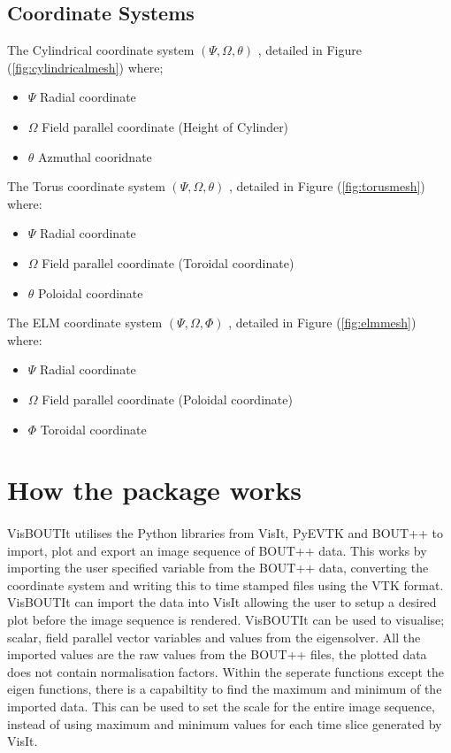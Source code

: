 \documentclass[12pt,a4paper]{article}
\begin{document}
\subsection{Coordinate Systems}
The Cylindrical coordinate system $(\Psi , \Omega , \theta )$ , detailed in Figure (\ref{fig:cylindricalmesh}) where;
\begin{itemize}
	\item{$\Psi$ Radial coordinate}
	\item{$\Omega$ Field parallel coordinate (Height of Cylinder)}
	\item{$\theta$ Azmuthal cooridnate}
\end{itemize}
The Torus coordinate system $(\Psi, \Omega, \theta)$ , detailed in Figure (\ref{fig:torusmesh}) where:
\begin{itemize}
	\item{$\Psi$ Radial coordinate}
	\item{$\Omega$ Field parallel coordinate (Toroidal coordinate)}
	\item{$\theta$ Poloidal coordinate}
\end{itemize}
The ELM coordinate system $(\Psi,\Omega, \Phi)$ , detailed in Figure (\ref{fig:elmmesh}) where:
\begin{itemize}
	\item{$\Psi$ Radial coordinate}
	\item{$\Omega$ Field parallel coordinate (Poloidal coordinate)}
	\item{$\Phi$ Toroidal coordinate}
\end{itemize}
		
\section{How the package works}
		
	\paragraph{}
	VisBOUTIt utilises the Python libraries from VisIt, PyEVTK and BOUT++ to import, plot and export an image sequence of BOUT++ data. This works by importing the user specified variable from the BOUT++ data, converting the coordinate system and writing this to time stamped files using the VTK format. VisBOUTIt can import the data into VisIt allowing the user to setup a desired plot before the image sequence is rendered. VisBOUTIt can be used to visualise; scalar, field parallel vector variables and values from the eigensolver. All the  imported values are the raw values from the BOUT++ files, the plotted data does not contain normalisation factors. Within the seperate functions except the eigen functions, there is a capabiltity to find the maximum and minimum of the imported data. This can be used to set the scale for the entire image sequence, instead of using maximum and minimum values for each time slice generated by VisIt.	
\end{document}
